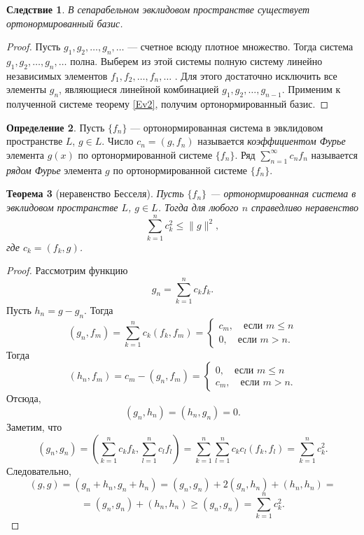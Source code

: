 \documentclass[12pt, titlepage, oneside]{amsbook}
\newtheorem{theorem}{Теорема}[chapter]
\newtheorem{corollary}[theorem]{Следствие}
\theoremstyle{definition}
\newtheorem{definition}[theorem]{Определение}
\theoremstyle{remark}
\begin{document}
\begin{corollary}
\label{Ev3}
В сепарабельном эвклидовом пространстве существует ортонормированный базис.
\end{corollary}

\begin{proof}
Пусть $g_1,g_2,\ldots, g_n,\ldots$ --- счетное всюду плотное множество. Тогда система $g_1,g_2,\ldots, g_n,\ldots$ полна. Выберем из этой системы полную систему линейно независимых элементов $f_1,f_2,\ldots, f_n,\ldots$ . Для этого достаточно исключить все элементы $g_n$, являющиеся линейной комбинацией $g_1,g_2,\ldots, g_{n-1}$. Применим к полученной системе теорему \ref{Ev2}, получим ортонормированный базис.
\end{proof}


 \begin{definition}
Пусть $\{f_n\}$ --- ортонормированная система в эвклидовом пространстве $L$, $g\in L$. Число $c_n=(g,f_n)$ называется \emph{коэффициентом Фурье} элемента $g(x)$ по ортонормированной системе $\{f_n\}$. Ряд $\sum\limits_{n=1}^{\infty} c_n f_n$ называется \emph{рядом Фурье} элемента $g$ по ортонормированной системе $\{f_n\}$.
\end{definition}


 \begin{theorem}[неравенство Бесселя]
\label{Bes}
Пусть $\{f_n\}$ --- ортонормированная система в эвклидовом пространстве $L$, $g\in L$. Тогда для любого $n$ справедливо неравенство $$\sum\limits_{k=1}^n c_k^2\leq \|g\|^2,$$ где $c_k=(f_k,g)$.
\end{theorem}

\begin{proof}
Рассмотрим функцию $$g_n=\sum\limits_{k=1}^n c_kf_k.$$ Пусть $h_n=g-g_n$. Тогда $$(g_n,f_m)=\sum\limits_{k=1}^n c_k(f_k,f_m)=\begin{cases}c_m,\quad\text{если $m\leq n$}\\
0,\quad\text{если $m>n$}.\end{cases}$$ Тогда $$(h_n,f_m)=c_m-(g_n,f_m)=\begin{cases}0,\quad\text{если $m\leq n$}\\
c_m,\quad\text{если $m>n$}.\end{cases}$$ Отсюда, $$(g_n,h_n)=(h_n,g_n)=0.$$ Заметим, что $$(g_n,g_n)=\left(\sum\limits_{k=1}^n c_kf_k,\sum\limits_{l=1}^n c_lf_l\right)=\sum\limits_{k=1}^n\sum\limits_{l=1}^nc_k c_l(f_k,f_l)=\sum\limits_{k=1}^n c_k^2.$$ Следовательно, $$(g,g)=(g_n+h_n,g_n+h_n)=(g_n,g_n)+2(g_n,h_n)+(h_n,h_n)=$$ $$=(g_n,g_n)+(h_n,h_n)\geq (g_n,g_n)=\sum\limits_{k=1}^n c_k^2.$$
\end{proof}
\end{document}
